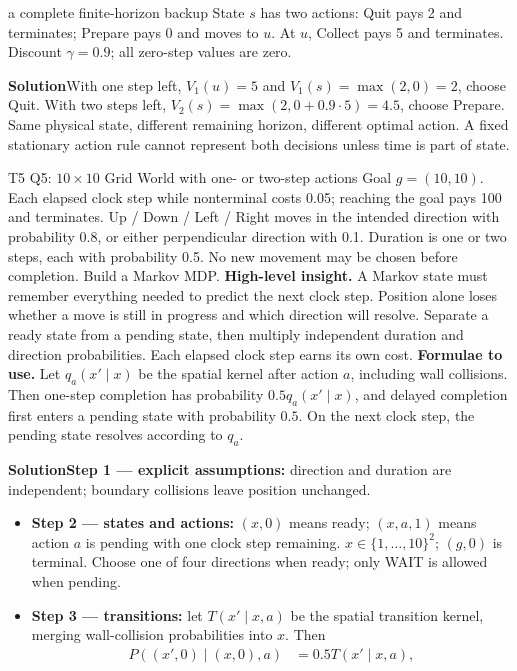 \documentclass[10pt,a4paper]{article}
\newcommand{\ans}{\par\smallskip\textbf{\color{good}Solution\quad}}
\begin{document}
\begin{question}{a complete finite-horizon backup}
State $s$ has two actions: Quit pays 2 and terminates; Prepare pays 0 and moves to $u$. At $u$, Collect pays 5 and terminates. Discount $\gamma=0.9$; all zero-step values are zero.
\ans With one step left, $V_1(u)=5$ and $V_1(s)=\max(2,0)=2$, choose Quit. With two steps left, $V_2(s)=\max(2,0+0.9\cdot5)=4.5$, choose Prepare. Same physical state, different remaining horizon, different optimal action. A fixed stationary action rule cannot represent both decisions unless time is part of state.
\end{question}

\begin{question}{T5 Q5: $10\times10$ Grid World with one- or two-step actions}\label{q:t5q5}
Goal $g=(10,10)$. Each elapsed clock step while nonterminal costs 0.05; reaching the goal pays 100 and terminates. Up / Down / Left / Right moves in the intended direction with probability 0.8, or either perpendicular direction with 0.1. Duration is one or two steps, each with probability 0.5. No new movement may be chosen before completion. Build a Markov MDP.
\textbf{High-level insight.} A Markov state must remember everything needed to predict the next clock step. Position alone loses whether a move is still in progress and which direction will resolve. Separate a ready state from a pending state, then multiply independent duration and direction probabilities. Each elapsed clock step earns its own cost.
\textbf{Formulae to use.} Let $q_a(x'\mid x)$ be the spatial kernel after action $a$, including wall collisions. Then one-step completion has probability $0.5q_a(x'\mid x)$, and delayed completion first enters a pending state with probability $0.5$. On the next clock step, the pending state resolves according to $q_a$.
\ans \textbf{Step 1 --- explicit assumptions:} direction and duration are independent; boundary collisions leave position unchanged.
\begin{itemize}
\item \textbf{Step 2 --- states and actions:} $(x,0)$ means ready; $(x,a,1)$ means action $a$ is pending with one clock step remaining. $x\in\{1,\ldots,10\}^2$; $(g,0)$ is terminal. Choose one of four directions when ready; only WAIT is allowed when pending.
\item \textbf{Step 3 --- transitions:} let $T(x'\mid x,a)$ be the spatial transition kernel, merging wall-collision probabilities into $x$. Then
\[
\begin{aligned}
P((x',0)\mid(x,0),a)&=0.5T(x'\mid x,a),\\

\end{aligned}\]
\end{itemize}
\end{question}
\end{document}
